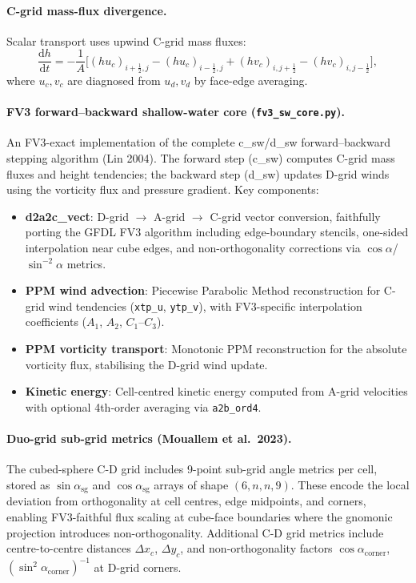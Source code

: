 \documentclass[11pt,a4paper]{article}
\newcommand{\dd}{\mathrm{d}}
\newcommand{\half}{\tfrac{1}{2}}
\begin{document}
\paragraph{C-grid mass-flux divergence.}
Scalar transport uses upwind C-grid mass fluxes:
\begin{equation}
  \frac{\dd h}{\dd t} = -\frac{1}{A}\bigl[(h u_c)_{i+\half,j}-(h u_c)_{i-\half,j}+(h v_c)_{i,j+\half}-(h v_c)_{i,j-\half}\bigr],
\end{equation}
where $u_c,v_c$ are diagnosed from $u_d,v_d$ by face-edge averaging.

\paragraph{FV3 forward--backward shallow-water core (\texttt{fv3\_sw\_core.py}).}
An FV3-exact implementation of the complete c\_sw/d\_sw forward--backward stepping algorithm (Lin 2004).  The forward step (c\_sw) computes C-grid mass fluxes and height tendencies; the backward step (d\_sw) updates D-grid winds using the vorticity flux and pressure gradient.  Key components:
\begin{itemize}[nosep]
  \item \textbf{d2a2c\_vect}: D-grid $\to$ A-grid $\to$ C-grid vector conversion, faithfully porting the GFDL FV3 algorithm including edge-boundary stencils, one-sided interpolation near cube edges, and non-orthogonality corrections via $\cos\alpha$/$\sin^{-2}\!\alpha$ metrics.
  \item \textbf{PPM wind advection}: Piecewise Parabolic Method reconstruction for C-grid wind tendencies (\texttt{xtp\_u}, \texttt{ytp\_v}), with FV3-specific interpolation coefficients ($A_1$, $A_2$, $C_1$--$C_3$).
  \item \textbf{PPM vorticity transport}: Monotonic PPM reconstruction for the absolute vorticity flux, stabilising the D-grid wind update.
  \item \textbf{Kinetic energy}: Cell-centred kinetic energy computed from A-grid velocities with optional 4th-order averaging via \texttt{a2b\_ord4}.
\end{itemize}

\paragraph{Duo-grid sub-grid metrics (Mouallem et al.\ 2023).}
The cubed-sphere C-D grid includes 9-point sub-grid angle metrics per cell, stored as $\sin\alpha_{\mathrm{sg}}$ and $\cos\alpha_{\mathrm{sg}}$ arrays of shape $(6,n,n,9)$.  These encode the local deviation from orthogonality at cell centres, edge midpoints, and corners, enabling FV3-faithful flux scaling at cube-face boundaries where the gnomonic projection introduces non-orthogonality.  Additional C-D grid metrics include centre-to-centre distances $\Delta x_c$, $\Delta y_c$, and non-orthogonality factors $\cos\alpha_{\mathrm{corner}}$, $(\sin^2\!\alpha_{\mathrm{corner}})^{-1}$ at D-grid corners.
\end{document}
